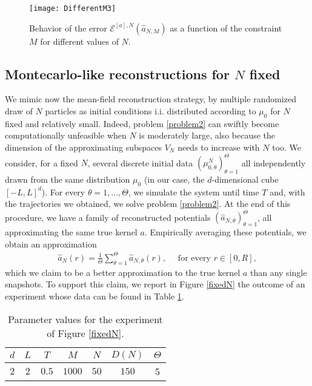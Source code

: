 \begin{figure}[h!]
\begin{center}
\texttt{[image: DifferentM3]}
\end{center}
\caption{Behavior of the error $\mathcal E^{[a],N}(\widehat a_{N,M})$ as a function of the constraint $M$ for different values of $N$.}\label{Mconstr}
\end{figure}

\subsection{Montecarlo-like reconstructions for $N$ fixed}

We mimic now the  mean-field reconstruction strategy, by multiple randomized draw of $N$ particles as initial conditions i.i. distributed according to $\mu_0$ for $N$ fixed and relatively small. Indeed, problem \eqref{problem2} can swiftly become computationally unfeasible when $N$ is moderately large, also because the dimension of the approximating subspaces $V_N$ needs to increase with $N$ too.  We consider, for a fixed $N$, several discrete initial data $(\mu^N_{0,\theta})_{\theta= 1}^{\Theta}$ all independently drawn from the same distribution $\mu_0$ (in our case, the $d$-dimensional cube $[-L,L]^d$). For every $\theta = 1,\ldots,\Theta$, we simulate the system until time $T$ and, with the trajectories we obtained, we solve problem \eqref{problem2}. At the end of this procedure, we have a family of reconstructed potentials $(\widehat{a}_{N,\theta})_{\theta= 1}^{\Theta}$, all approximating the same true kernel $a$. Empirically averaging these potentials, we obtain an approximation
\begin{align*}
\widehat{a}_N(r) = \frac{1}{\Theta} \sum^{\Theta}_{\theta = 1}\widehat{a}_{N,\theta}(r), \quad \text{ for every } r \in [0,R],
\end{align*}
which we claim to be a better approximation to the true kernel $a$ than any single snapshots. To support this claim, we report in Figure \ref{fixedN} the outcome of an experiment whose data can be found in Table \ref{tab:fig5}.

\begin{table}[h]
\begin{center}
\begin{tabular}{ |c|c|c|c|c|c|c| }
\hline
  $d$ & $L$ & $T$ & $M$ & $N$ & $D(N)$ & $\Theta$ \\
\hline
\hline
  $2$ & $2$ & $0.5$ & $1000$ & $50$ & $150$ & 5  \\
\hline
\end{tabular}
\end{center}
\vspace{-0.5cm}
\caption{Parameter values for the experiment of Figure \ref{fixedN}.} \label{tab:fig5} 
\end{table}

